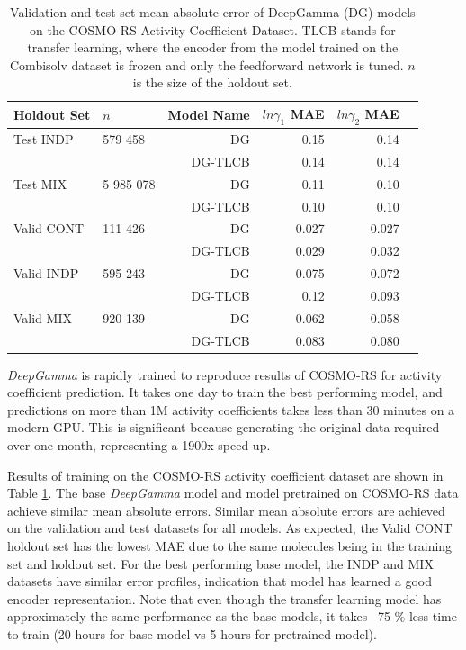 \begin{table}
    \centering
    \caption{Validation and test set mean absolute error of DeepGamma (DG) models on the COSMO-RS Activity  Coefficient Dataset. TLCB stands for transfer learning, where the encoder from the model trained on the Combisolv dataset is frozen and only the feedforward network is tuned. $n$ is the size of the holdout set.}
    \label{tab:cosmo_rs_results}
    \begin{tabular}{llrrrr}
    \toprule
    Holdout Set & $n$ & Model Name &  $ln\gamma_1$ MAE &   $ln\gamma_2$ MAE \\
    \midrule
    Test INDP & 579 458 &  DG & 0.15 & 0.14 \\
              & &  DG-TLCB & 0.14 & 0.14 \\
    Test MIX & 5 985 078 & DG & 0.11 & 0.10 \\
              & & DG-TLCB & 0.10 & 0.10 \\
    Valid CONT & 111 426 &  DG & 0.027 & 0.027 \\
              & &  DG-TLCB & 0.029 & 0.032 \\
    Valid INDP & 595 243 &  DG & 0.075 & 0.072 \\
              & &  DG-TLCB & 0.12 & 0.093 \\
    Valid MIX & 920 139 & DG & 0.062 & 0.058 \\
              & &  DG-TLCB & 0.083 & 0.080 \\
    \bottomrule
    \end{tabular}
\end{table}


\textit{DeepGamma} is rapidly trained to reproduce results of COSMO-RS for activity coefficient prediction. It takes one day to train the best performing model, and predictions on more than 1M activity coefficients takes less than 30 minutes on a modern GPU. This is significant because generating the original data required over one month, representing a 1900x speed up.


Results of training on the COSMO-RS activity coefficient dataset are shown in Table \ref{tab:cosmo_rs_results}. The base \textit{DeepGamma} model  and model pretrained on COSMO-RS data achieve similar mean absolute errors. Similar mean absolute errors are achieved on the validation and test datasets for all models. As expected, the Valid CONT holdout set has the lowest MAE due to the same molecules being in the training set and holdout set.  For the best performing base model, the INDP and MIX datasets have similar error profiles, indication that model has learned a good encoder representation.  Note that even though the transfer learning model has approximately the same performance as the base models, it takes ~75 \% less time to train (20 hours for base model vs 5 hours for pretrained model). 


